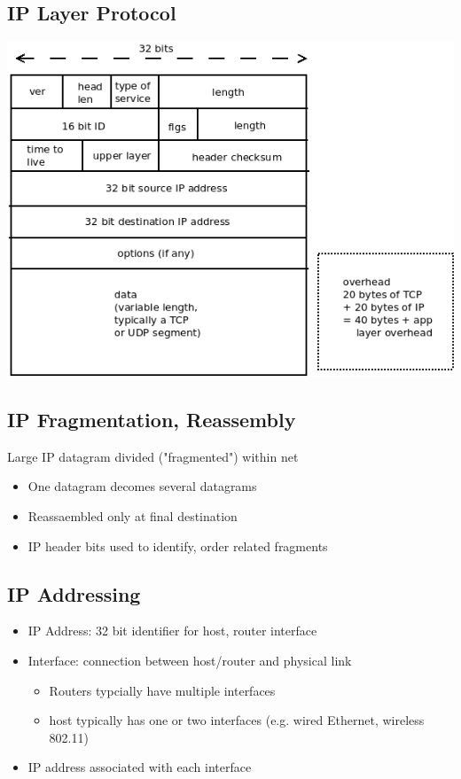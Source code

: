 \documentclass[11pt]{article}
\begin{document}
\subsection{IP Layer Protocol}
\label{sec:org8a5c410}

\begin{center}
\includegraphics[width=.9\linewidth]{../img/ipLayerProtocol.png}
\end{center}


\subsection{IP Fragmentation, Reassembly}
\label{sec:org7234bc9}

Large IP datagram divided ("fragmented") within net
\begin{itemize}
\item One datagram decomes several datagrams
\item Reassaembled only at final destination
\item IP header bits used to identify, order related fragments
\end{itemize}

\subsection{IP Addressing}
\label{sec:org079cf57}
\begin{itemize}
\item IP Address: 32 bit identifier for host, router interface
\item Interface: connection between host/router and physical link
\begin{itemize}
\item Routers typcially have multiple interfaces
\item host typically has one or two interfaces (e.g. wired Ethernet,
wireless 802.11)
\end{itemize}
\item IP address associated with each interface
\end{itemize}
\end{document}
